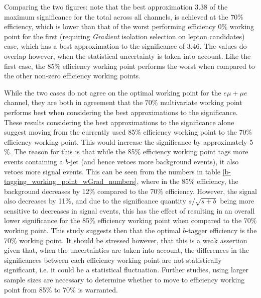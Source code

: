 Comparing the two figures: note that the best approximation 3.38 of the maximum significance for the total across all channels, is achieved at the 70$\%$ efficiency, which is lower than that of the worst performing efficiency 0$\%$ working point for the first (requiring \textit{Gradient} isolation selection on lepton candidates) case, which has a best approximation to the significance of $3.46$. The values do overlap however, when the statistical uncertainty is taken into account. Like the first case, the 85$\%$ efficiency working point performs the worst when compared to the other non-zero efficiency working points.

While the two cases do not agree on the optimal working point for the $e\mu +\mu e$ channel, they are both in agreement that the $70\%$ multivariate working point performs best when considering the best approximations to the significance. These results considering the best approximations to the significance alone suggest moving from the currently used 85$\%$ efficiency working point to the 70$\%$ efficiency working point. This would increase the significance by approximately 5$\%$. The reason for this is that while the 85$\%$ efficiency working point tags more events containing a $b$-jet (and hence vetoes more background events), it also vetoes more signal events. This can be seen from the numbers in table \ref{b-tagging_working_point_wGrad_numbers}, where in the 85$\%$ efficiency, the background decreases by 12$\%$ compared to the 70$\%$ efficiency. However, the signal also decreases by 11$\%$, and due to the significance quantity $s/\sqrt{s+b}$ being more sensitive to decreases in signal events, this has the effect of resulting in an overall lower significance for the 85$\%$ efficiency working point when compared to the 70$\%$ working point. This study suggests then that the optimal $b$-tagger efficiency is the 70$\%$ working point. It should be stressed however, that this is a weak assertion given that, when the uncertainties are taken into account, the differences in the significances between each efficiency working point are not statistically significant, i.e. it could be a statistical fluctuation. Further studies, using larger sample sizes are necessary to determine whether to move to efficiency working point from 85$\%$ to 70$\%$ is warranted.

